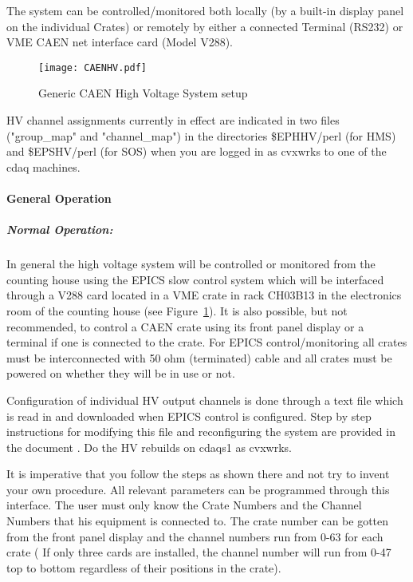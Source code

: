 The system can be controlled/monitored both locally (by a built-in
display panel on the individual Crates) or remotely by either a
connected Terminal (RS232) or VME CAEN net interface card (Model V288).


\begin{figure}
\texttt{[image: CAENHV.pdf]}
\caption{Generic CAEN High Voltage System setup\label{fig:caen_setup}}
\end{figure}

HV channel assignments currently in effect are indicated in 
two files ("group\_map" and
"channel\_map") in the directories \$EPHHV/perl (for HMS) and \$EPSHV/perl (for
SOS) when you are logged in as cvxwrks to one of the cdaq machines.

\paragraph{General Operation}

\subparagraph{Normal Operation:}

In general the high voltage system will be controlled or monitored
from the counting house using the EPICS slow control system which will
be interfaced through a V288 card located in a VME crate in rack CH03B13
in the electronics room of the counting house
(see Figure~\ref{fig:caen_setup}).  It is also possible, but not recommended,
to control a CAEN crate using its front panel display or a terminal
if one is connected to the crate.
For EPICS control/monitoring all crates must be interconnected with 50
ohm (terminated) cable and all crates must be powered on whether they
will be in use or not.

Configuration of individual HV output channels is done through a
text file which is read in and downloaded when EPICS control is
configured. Step by step instructions for modifying this file and
reconfiguring the system are provided in the document
. Do the HV rebuilds on cdaqs1 as cvxwrks.


It is imperative that
you follow the steps as shown there and not try to invent your own
procedure.
All relevant parameters
can be programmed through this interface.  The user must only know the
Crate Numbers and the Channel Numbers that his equipment is connected
to.  The crate number can be gotten from the front panel display and the
channel numbers run from 0-63 for each crate ( If only three cards are
installed, the channel number will run from 0-47 top to bottom
regardless of their positions in the crate).

